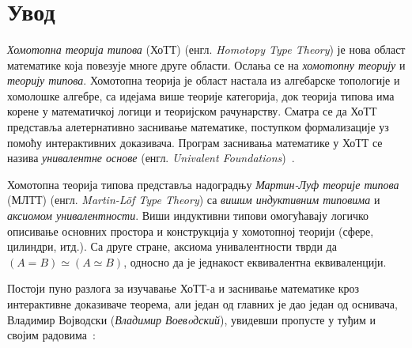 \documentclass[12pt,oneside]{memoir}
\begin{document}
\frontmatter\

\naslovna\

\komisija\


\apstrakt\

\tableofcontents*

\mainmatter\

\chapter{Увод}

\emph{Хомотопна теорија типова} (ХоТТ) (енгл. \emph{Homotopy Type Theory}) је нова област математике која повезује многе друге области. Ослања се на \emph{хомотопну теорију} и \emph{теорију типова}. Хомотопна теорија је област настала из алгебарске топологије и хомолошке алгебре, са идејама више теорије категорија, док теорија типова има корене у математичкој логици и теоријском рачунарству. Сматра се да ХоТТ представља алетернативно заснивање математике, поступком формализације уз помоћу интерактивних доказивача. Програм заснивања математике у ХоТТ се назива \emph{унивалентне основе} (енгл. \emph{Univalent Foundations})~\cite{hottbook}. 

Хомотопна теорија типова представља надоградњу \emph{Мартин-Луф теорије типова} (МЛТТ) (енгл. \emph{Martin-Löf Type Theory}) са \emph{вишим индуктивним типовима} и \emph{аксиомом унивалентности}. Виши индуктивни типови омогућавају логичко описивање основних простора и конструкција у хомотопној теорији (сфере, цилиндри, итд.). Са друге стране, аксиома унивалентности тврди да $(A = B) \simeq (A \simeq B)$, односно да је једнакост еквивалентна еквиваленцији.

Постоји пуно разлога за изучавање ХоТТ-а и заснивање математике кроз интерактивне доказиваче теорема, али један од главних је дао један од оснивача, Владимир Војводски (\emph{Владимир Воевoдский}), увидевши пропусте у туђим и својим радовима~\cite{vlad14}:
\end{document}
